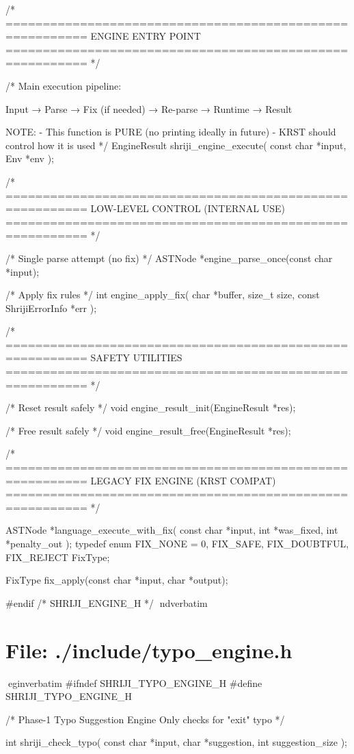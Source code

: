 \documentclass{article}
\begin{document}
/* =========================================================
   ENGINE ENTRY POINT
   ========================================================= */

/*
   Main execution pipeline:

   Input
     → Parse
     → Fix (if needed)
     → Re-parse
     → Runtime
     → Result

   NOTE:
   - This function is PURE (no printing ideally in future)
   - KRST should control how it is used
*/
EngineResult shriji_engine_execute(
    const char *input,
    Env *env
);

/* =========================================================
   LOW-LEVEL CONTROL (INTERNAL USE)
   ========================================================= */

/* Single parse attempt (no fix) */
ASTNode *engine_parse_once(const char *input);

/* Apply fix rules */
int engine_apply_fix(
    char *buffer,
    size_t size,
    const ShrijiErrorInfo *err
);

/* =========================================================
   SAFETY UTILITIES
   ========================================================= */

/* Reset result safely */
void engine_result_init(EngineResult *res);

/* Free result safely */
void engine_result_free(EngineResult *res);

/* =========================================================
   LEGACY FIX ENGINE (KRST COMPAT)
   ========================================================= */

ASTNode *language_execute_with_fix(
    const char *input,
    int *was_fixed,
    int *penalty_out
);
typedef enum {
    FIX_NONE = 0,
    FIX_SAFE,
    FIX_DOUBTFUL,
    FIX_REJECT
} FixType;

FixType fix_apply(const char *input, char *output);

#endif /* SHRIJI_ENGINE_H */
nd{verbatim}
\section*{File: ./include/typo_engine.h}
egin{verbatim}
#ifndef SHRIJI_TYPO_ENGINE_H
#define SHRIJI_TYPO_ENGINE_H

/*
    Phase-1 Typo Suggestion Engine
    Only checks for "exit" typo
*/

int shriji_check_typo(
    const char *input,
    char *suggestion,
    int suggestion_size
);
\end{document}
